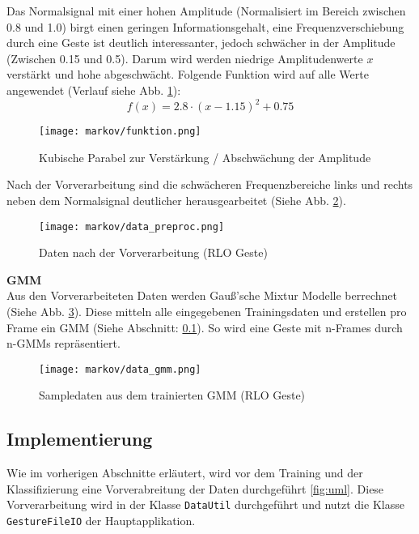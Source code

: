 Das Normalsignal mit einer hohen Amplitude (Normalisiert im Bereich zwischen 0.8 und 1.0) birgt einen geringen Informationsgehalt, 
eine Frequenzverschiebung durch eine Geste ist deutlich interessanter, jedoch schwächer in der Amplitude (Zwischen 0.15 und 0.5).
Darum wird werden niedrige Amplitudenwerte \( x \) verstärkt und hohe abgeschwächt. 
Folgende Funktion wird auf alle Werte angewendet  (Verlauf siehe Abb. \ref{fig:funktion}): \\
\[ f(x) = 2.8 \cdot ( x - 1.15 )^2 + 0.75 \]
\begin{figure}[htbp] \centering
    \texttt{[image: markov/funktion.png]}
    \caption{Kubische Parabel zur Verstärkung / Abschwächung der Amplitude}
    \label{fig:funktion}
\end{figure}

Nach der Vorverarbeitung sind die schwächeren Frequenzbereiche links und rechts neben dem Normalsignal deutlicher 
herausgearbeitet (Siehe Abb. \ref{fig:data_preproc}).  

\begin{figure}[htbp] \centering
    \texttt{[image: markov/data\_preproc.png]}
    \caption{Daten nach der Vorverarbeitung (\acl{RLO} Geste)}
    \label{fig:data_preproc}
\end{figure}

\textbf{\acl{GMM}} \\
Aus den Vorverarbeiteten Daten werden Gauß’sche Mixtur Modelle berrechnet (Siehe Abb. \ref{fig:data_gmm}). 
Diese mitteln alle eingegebenen Trainingsdaten und erstellen pro Frame ein \acl{GMM} (Siehe Abschnitt: 
\ref{sec:impl}). So wird eine Geste mit n-Frames durch n-\acl{GMM}s repräsentiert.

\begin{figure}[htbp] \centering
    \texttt{[image: markov/data\_gmm.png]}
    \caption{Sampledaten aus dem trainierten \acl{GMM} (\acl{RLO} Geste)}
    \label{fig:data_gmm}
\end{figure}


\subsection{Implementierung}  \label{sec:impl}
Wie im vorherigen Abschnitte erläutert, wird vor dem Training und der Klassifizierung eine Vorverabreitung der Daten durchgeführt \ref{fig:uml}.
Diese Vorverarbeitung wird in der Klasse \texttt{DataUtil} durchgeführt und nutzt die Klasse \texttt{GestureFileIO} der Hauptapplikation.

